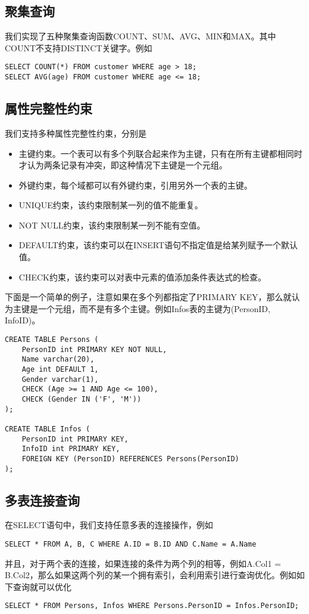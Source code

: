 \documentclass[10pt]{article}
\begin{document}
\subsection{聚集查询}
我们实现了五种聚集查询函数COUNT、SUM、AVG、MIN和MAX。其中COUNT不支持DISTINCT关键字。例如
\begin{verbatim}
SELECT COUNT(*) FROM customer WHERE age > 18;
SELECT AVG(age) FROM customer WHERE age <= 18;
\end{verbatim}
\subsection{属性完整性约束}
我们支持多种属性完整性约束，分别是
\begin{itemize}
	\item 主键约束。一个表可以有多个列联合起来作为主键，只有在所有主键都相同时才认为两条记录有冲突，即这种情况下主键是一个元组。
	\item 外键约束，每个域都可以有外键约束，引用另外一个表的主键。
	\item UNIQUE约束，该约束限制某一列的值不能重复。
	\item NOT NULL约束，该约束限制某一列不能有空值。
	\item DEFAULT约束，该约束可以在INSERT语句不指定值是给某列赋予一个默认值。
	\item CHECK约束，该约束可以对表中元素的值添加条件表达式的检查。
\end{itemize}
下面是一个简单的例子，注意如果在多个列都指定了PRIMARY KEY，那么就认为主键是一个元组，而不是有多个主键。例如Infos表的主键为(PersonID, InfoID)。
\begin{verbatim}
CREATE TABLE Persons (
    PersonID int PRIMARY KEY NOT NULL,
    Name varchar(20),
    Age int DEFAULT 1,
    Gender varchar(1),
    CHECK (Age >= 1 AND Age <= 100),
    CHECK (Gender IN ('F', 'M'))
);

CREATE TABLE Infos (
    PersonID int PRIMARY KEY,
    InfoID int PRIMARY KEY,
    FOREIGN KEY (PersonID) REFERENCES Persons(PersonID)
);
\end{verbatim}
\subsection{多表连接查询}
在SELECT语句中，我们支持任意多表的连接操作，例如
\begin{verbatim}
SELECT * FROM A, B, C WHERE A.ID = B.ID AND C.Name = A.Name
\end{verbatim}
并且，对于两个表的连接，如果连接的条件为两个列的相等，例如A.Col1 = B.Col2，那么如果这两个列的某一个拥有索引，会利用索引进行查询优化。例如如下查询就可以优化
\begin{verbatim}
SELECT * FROM Persons, Infos WHERE Persons.PersonID = Infos.PersonID;
\end{verbatim}
\end{document}
